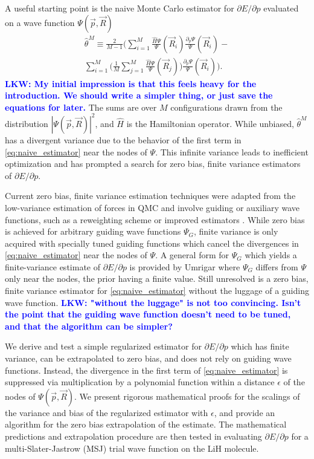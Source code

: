 \documentclass[twocolumn]{revtex4-1}
\newcommand{\lucas}[1]{\textbf{\textcolor{blue}{LKW: #1}}}
\begin{document}
A useful starting point is the naive Monte Carlo estimator for $\partial E/\partial p$ evaluated on a wave function $\Psi(\vec{p}, \vec{R})$ 
\begin{equation}
\begin{split}
\hat{\theta}^M \equiv \frac{2}{M-1}\Bigg(\sum_{i=1}^M \frac{\hat{H}\Psi}{\Psi}(\vec{R}_i) \frac{\partial_p \Psi}{\Psi}(\vec{R}_i)- \\ \sum_{i=1}^M \Big(\frac{1}{M} \sum_{j=1}^M \frac{\hat{H}\Psi}{\Psi}(\vec{R}_j)\Big)\frac{\partial_p \Psi}{\Psi}(\vec{R}_i) \Bigg). 
\end{split}
\label{eq:naive_estimator}
\end{equation}
\lucas{My initial impression is that this feels heavy for the introduction. We should write a simpler thing, or just save the equations for later.}
The sums are over $M$ configurations drawn from the distribution $|\Psi(\vec{p}, \vec{R})|^2$, and $\hat{H}$ is the Hamiltonian operator.
While unbiased, $\hat{\theta}^M$ has a divergent variance \cite{Avella, doi:10.1063/1.4933112} due to the behavior of the first term in \eqref{eq:naive_estimator} near the nodes of $\Psi$.
This infinite variance leads to inefficient optimization and has prompted a search for zero bias, finite variance estimators of $\partial E/\partial p$.

Current zero bias, finite variance estimation techniques were adapted from the low-variance estimation of forces in QMC \cite{doi:10.1063/1.462059, doi:10.1063/1.3516208, Phys2016} and involve guiding or auxiliary wave functions, such as a reweighting scheme \cite{Avella, Attaccalite2008, Zen2013} or improved estimators \cite{Assaraf1999, doi:10.1063/1.1286598, Assaraf2003}.
While zero bias is achieved for arbitrary guiding wave functions $\Psi_G$, finite variance is only acquired with specially tuned guiding functions which cancel the divergences in \eqref{eq:naive_estimator} near the nodes of $\Psi$.
A general form for $\Psi_G$ which yields a finite-variance estimate of $\partial E/\partial p$ is provided by Umrigar \cite{doi:10.1063/1.4933112} where $\Psi_G$ differs from $\Psi$ only near the nodes, the prior having a finite value.
Still unresolved is a zero bias, finite variance estimator for \eqref{eq:naive_estimator} without the luggage of a guiding wave function. 
\lucas{"without the luggage" is not too convincing. Isn't the point that the guiding wave function doesn't need to be tuned, and that the algorithm can be simpler?}

We derive and test a simple regularized estimator for $\partial E/\partial p$ which has finite variance, can be extrapolated to zero bias, and does not rely on guiding wave functions.
Instead, the divergence in the first term of \eqref{eq:naive_estimator} is suppressed via multiplication by a polynomial function within a distance $\epsilon$ of the nodes of $\Psi(\vec{p}, \vec{R})$. 
We present rigorous mathematical proofs for the scalings of the variance and bias of the regularized estimator with $\epsilon$, and provide an algorithm for the zero bias extrapolation of the estimate.
The mathematical predictions and extrapolation procedure are then tested in evaluating $\partial E/\partial p$ for a multi-Slater-Jastrow (MSJ) trial wave function on the LiH molecule.
\end{document}
